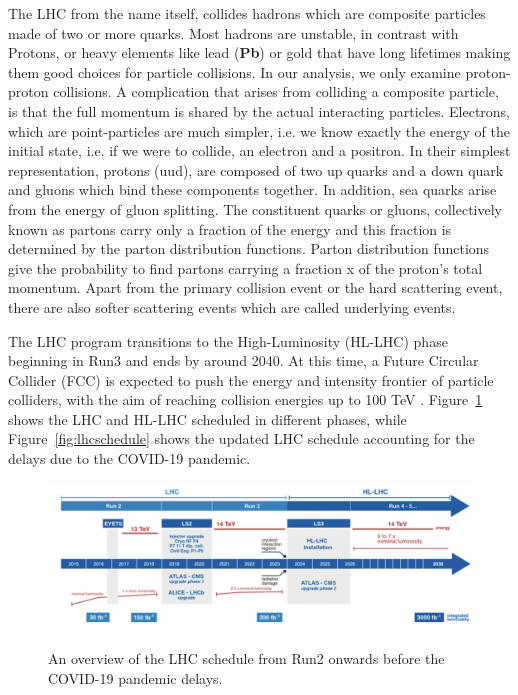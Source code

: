 The LHC from the name itself, collides hadrons which are composite particles made of two or more quarks. Most hadrons are unstable, in contrast with Protons, or heavy elements like lead (\textbf{Pb}) or gold that have long lifetimes making them good choices for particle collisions. In our analysis, we only examine proton-proton collisions. A complication that arises from colliding a composite particle, is that the full momentum is shared by the actual interacting particles. Electrons, which are point-particles are much simpler, i.e. we know exactly the energy of the initial state, i.e. if we were to collide, an electron and a positron. In their simplest representation, protons (uud), are composed of two up quarks and a down quark and gluons which bind these components together. In addition, sea quarks arise from the energy of gluon splitting. The constituent quarks or gluons, collectively known as partons carry only a fraction of the energy and this fraction is determined by the parton distribution functions. Parton distribution functions give the probability to find partons carrying a fraction x of the proton's total momentum. Apart from the primary collision event or the hard scattering event, there are also softer scattering events which are called underlying events. 

The LHC program transitions to the High-Luminosity (HL-LHC) phase beginning in Run3 and ends by around 2040. At this time, a Future Circular Collider (FCC) is expected to push the energy and intensity frontier of particle colliders, with the aim of reaching collision energies up to 100 TeV \cite{Blondel:2021ema}. Figure~\ref{fig:hl-lhc} shows the LHC and HL-LHC scheduled in different phases, while Figure~\ref{fig:lhcschedule} shows the updated LHC schedule accounting for the delays due to the COVID-19 pandemic.

\begin{figure}[!htbp]
	\centering
    \caption{An overview of the LHC schedule from Run2 onwards before the COVID-19 pandemic delays.}
 	\includegraphics[scale=0.6]{fig/LHC-schedule.png}
	\label{fig:hl-lhc}
\end{figure}


